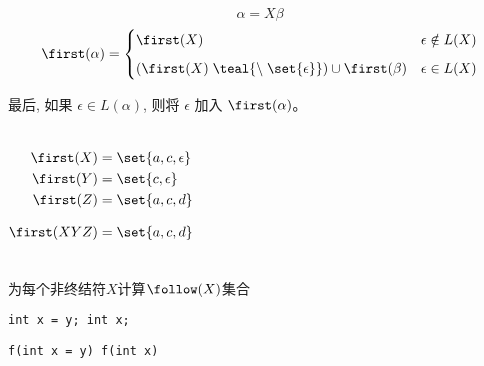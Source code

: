 \begin{frame}{}
  \begin{center}

    \[
      \alpha = X \beta
    \]
    \[
      \first(\alpha) =
      \begin{cases}
        \first(X) & \epsilon \notin L(X) \\[6pt]
        (\first(X) \;\teal{\setminus\; \set{\epsilon}}) \cup \first(\beta) & \epsilon \in L(X)
      \end{cases}
    \]

    \vspace{0.60cm}
    最后, 如果 $\epsilon \in L(\alpha)$, 则将 $\epsilon$ 加入 $\first(\alpha)$。
  \end{center}
\end{frame}

\begin{frame}{}
  \begin{columns}
      
      \pause
      \begin{align*}
        \first(X) &= \set{a, c, \epsilon} \\
        \first(Y) &= \set{c, \epsilon} \\
        \first(Z) &= \set{a, c, d} \\[8pt]
        \first(XYZ) &= \set{a, c, d}
      \end{align*}
  \end{columns}
\end{frame}

\begin{frame}{}
  \begin{center}
    {\large 为每个非终结符$X$计算$\follow(X)$集合}

    

    \pause
  \end{center}
\end{frame}

\begin{frame}{}
  \begin{center}

    \vspace{0.30cm}
    \texttt{int x = y; \qquad int x;}

    \vspace{0.20cm}
    \texttt{f(int x = y) \qquad f(int x)}
  \end{center}
\end{frame}

